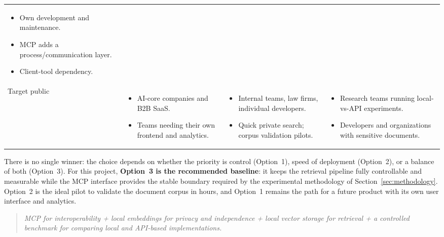 \documentclass[11pt,a4paper]{article}
\begin{document}
\begin{longtable}{>{\raggedright\arraybackslash}p{2.2cm}>{\raggedright\arraybackslash}p{4.2cm}>{\raggedright\arraybackslash}p{4.2cm}>{\raggedright\arraybackslash}p{4.2cm}}
\begin{itemize}[leftmargin=1.2em, nosep, topsep=0pt]
  \item Own development and maintenance.
  \item MCP adds a process/communication layer.
  \item Client-tool dependency.
\end{itemize} \\
Target public &
\begin{itemize}[leftmargin=1.2em, nosep, topsep=0pt]
  \item AI-core companies and B2B SaaS.
  \item Teams needing their own frontend and analytics.
\end{itemize} &
\begin{itemize}[leftmargin=1.2em, nosep, topsep=0pt]
  \item Internal teams, law firms, individual developers.
  \item Quick private search; corpus validation pilots.
\end{itemize} &
\begin{itemize}[leftmargin=1.2em, nosep, topsep=0pt]
  \item Research teams running local-vs-API experiments.
  \item Developers and organizations with sensitive documents.
\end{itemize} \\
\bottomrule
\end{longtable}

There is no single winner: the choice depends on whether the priority is
control (Option~1), speed of deployment (Option~2), or a balance of both
(Option~3). For this project, \textbf{Option~3 is the recommended baseline}:
it keeps the retrieval pipeline fully controllable and measurable while the
MCP interface provides the stable boundary required by the experimental
methodology of Section~\ref{sec:methodology}. Option~2 is the ideal pilot to
validate the document corpus in hours, and Option~1 remains the path for a
future product with its own user interface and analytics.

\begin{quote}
\emph{MCP for interoperability + local embeddings for privacy and independence
+ local vector storage for retrieval + a controlled benchmark for comparing
local and API-based implementations.}
\end{quote}
\end{document}
